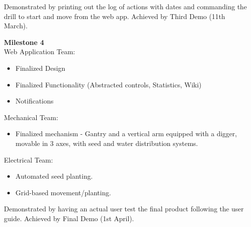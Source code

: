 \documentclass{article}
\begin{document}
Demonstrated by printing out the log of actions with dates and commanding the drill to start and move from the web app. Achieved by Third Demo (11th March).     


\textbf{Milestone 4} \\
Web Application Team:
\begin{itemize}
    \vspace{-3mm}
    \setlength\itemsep{-0.6em}
    \item Finalized Design
    \item Finalized Functionality (Abstracted controls, Statistics, Wiki)
    \item Notifications
    \vspace{-3mm}
\end{itemize}
Mechanical Team:
\begin{itemize}
    \vspace{-3mm}
    \setlength\itemsep{-0.6em}
    \item Finalized mechanism - Gantry and a vertical arm equipped with a digger, movable in 3 axes, with seed and water distribution systems.
\end{itemize}
Electrical Team:
\begin{itemize}
    \vspace{-3mm}
    \setlength\itemsep{-0.6em}
    \item Automated seed planting.
    \item Grid-based movement/planting.
    \vspace{-3mm}
\end{itemize}

Demonstrated by having an actual user test the final product following the user guide. Achieved by Final Demo (1st April). 
\end{document}

